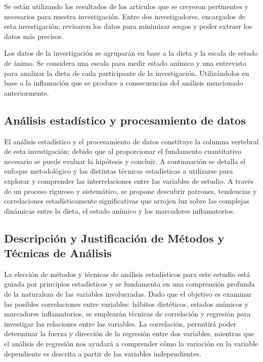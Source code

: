 \documentclass[jou]{apa7}
\begin{document}
	
	Se están utilizando los resultados de los artículos que se creyeron
	pertinentes y necesarios para nuestra investigación. Entre dos
	investigadores, encargados de esta investigación; revisaron los datos
	para minimizar sesgos y poder extraer los datos más precisos.
	
	Los datos de la investigación se agruparán en base a la dieta y la
	escala de estado de ánimo. Se considera una escala para medir estado
	anímico y una entrevista para analizar la dieta de cada participante de
	la investigación. Utilizándolos en base a la inflamación que se produce
	a consecuencias del análisis mencionado anteriormente.
	
	\subsection{Análisis estadístico y procesamiento de datos}
	
	El análisis estadístico y el procesamiento de datos constituye la
	columna vertebral de esta investigación; debido que al proporcionar el
	fundamento cuantitativo necesario se puede evaluar la hipótesis y
	concluir. A continuación se detalla el enfoque metodológico y las
	distintas técnicas estadísticas a utilizarse para explorar y comprender
	las interrelaciones entre las variables de estudio. A través de un
	proceso riguroso y sistemático, se propone descubrir patrones,
	tendencias y correlaciones estadísticamente significativas que arrojen
	luz sobre las complejas dinámicas entre la dieta, el estado anímico y
	los marcadores inflamatorios.
	
	\subsection{Descripción y Justificación de Métodos y Técnicas de Análisis}\label{descripciuxf3n-y-justificaciuxf3n-de-muxe9todos-y-tuxe9cnicas-de-anuxe1lisis}
	
	La elección de métodos y técnicas de análisis estadísticos para este
	estudio está guiada por principios estadísticos y se fundamenta en una
	comprensión profunda de la naturaleza de las variables involucradas.
	Dado que el objetivo es examinar las posibles correlaciones entre
	variables: hábitos dietéticos, estados anímicos y marcadores
	inflamatorios, se emplearán técnicas de correlación y regresión para
	investigar las relaciones entre las variables. La correlación, permitirá
	poder determinar la fuerza y dirección de la regresión entre dos
	variables, mientras que el análisis de regresión nos ayudará a
	comprender cómo la variación en la variable dependiente es descrita a
	partir de las variables independientes.\\
	
\end{document}
